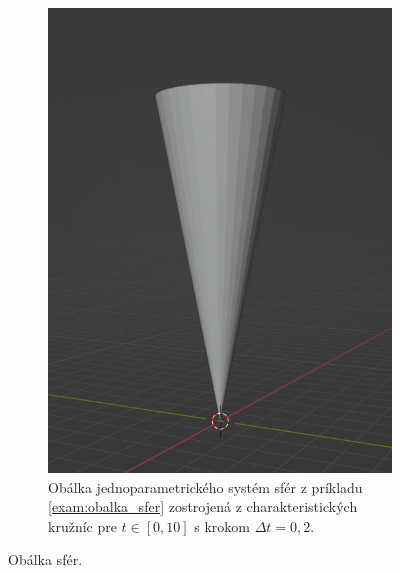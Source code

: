 \begin{example}
\begin{figure}[h]
\begin{subfigure}[t]{0.45\textwidth}
       \includegraphics[width=\textwidth]{images/envelope_cornetto.png}
	\caption[Obálka jednoparametrického systém sfér.]{Obálka jednoparametrického systém sfér z príkladu \ref{exam:obalka_sfer} zostrojená z charakteristických kružníc pre $t \in [0,10]$ s krokom $\Delta t = 0,2.$ }
    \end{subfigure}
    \caption{Obálka sfér.}
    \label{fig:envelope_spheres}
\end{figure}

%
\end{example}


